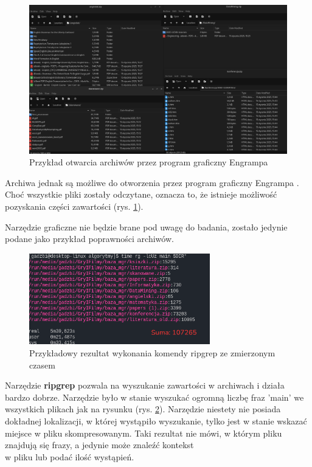 \begin{figure}[htbp]
\centering
\includegraphics[width=1\textwidth]{./images/przykład-otwarcia-archiwów.png}
\caption{Przykład otwarcia archiwów przez program graficzny Engrampa}
\label{fig:engrampaExample}
\end{figure}

Archiwa jednak są możliwe do otworzenia przez program graficzny Engrampa \cite{bib:internet:EngrampaArchives}.
Choć wszystkie pliki zostały odczytane, oznacza to, że istnieje możliwość pozyskania
części zawartości (rys. \ref{fig:engrampaExample}).

Narzędzie graficzne nie będzie brane pod uwagę do badania, zostało jedynie podane
jako przykład poprawności archiwów.

\begin{figure}[htbp]
\centering
\includegraphics[width=0.7\textwidth]{./images/ripgrep-result-main.png}
\caption{Przykładowy rezultat wykonania komendy ripgrep ze zmierzonym czasem}
\label{fig:ripgrepResultMain}
\end{figure}

Narzędzie \textbf{ripgrep} pozwala na wyszukanie zawartości w archiwach i działa bardzo dobrze.
Narzędzie było w stanie wyszukać ogromną liczbę fraz 'main' we wszystkich plikach 
jak na rysunku (rys. \ref{fig:ripgrepResultMain}).
Narzędzie niestety nie posiada dokładnej lokalizacji, w której wystąpiło wyszukanie,
tylko jest w stanie wskazać miejsce w pliku skompresowanym.
Taki rezultat nie mówi, w którym pliku znajdują się frazy, a jedynie może znaleźć 
kontekst \\ w pliku lub podać ilość wystąpień.

